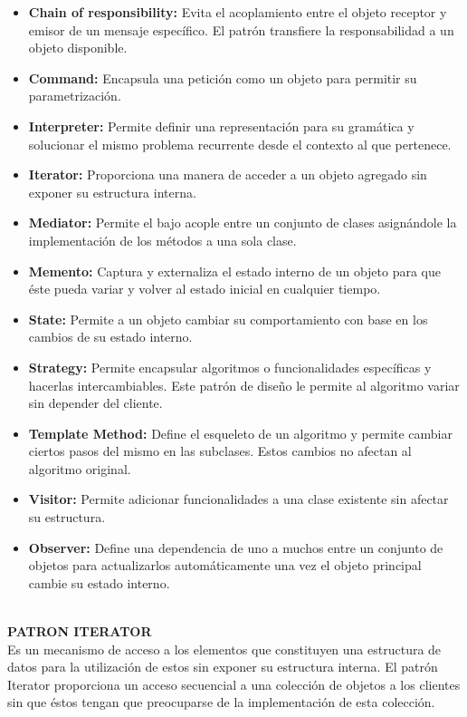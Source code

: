 \documentclass[twoside,twocolumn]{article}
\begin{document}
	\begin{itemize}
		\item \textbf{Chain of responsibility:}	Evita el acoplamiento entre el objeto receptor y emisor de un mensaje específico. El patrón transfiere la responsabilidad a un objeto disponible.  
		\item \textbf{Command:} Encapsula una petición como un objeto para permitir su parametrización.   
		\item \textbf{Interpreter:} Permite definir una representación para su gramática y solucionar el mismo problema recurrente desde el contexto al que pertenece.  
		\item \textbf{Iterator:}	Proporciona una manera de acceder a un objeto agregado sin exponer su estructura interna.  
		\item \textbf{Mediator:}  Permite el bajo acople entre un conjunto de clases asignándole la implementación de los métodos a una sola clase.   
		\item \textbf{Memento:} Captura y externaliza el estado interno de un objeto para que éste pueda variar y volver al estado inicial en cualquier tiempo.   
		\item \textbf{State:} Permite a un objeto cambiar su comportamiento con base en los cambios de su estado interno.  
        \item \textbf{Strategy:} Permite encapsular algoritmos o funcionalidades específicas y hacerlas intercambiables. Este patrón de diseño le permite al algoritmo variar sin depender del cliente.  
        \item \textbf{Template Method:} Define el esqueleto de un algoritmo y permite cambiar ciertos pasos del mismo en las subclases. Estos cambios no afectan al algoritmo original.  
        \item \textbf{Visitor:} Permite adicionar funcionalidades a una clase existente sin afectar su estructura. 
        \item \textbf{Observer:} Define una dependencia de uno a muchos entre un conjunto de objetos para actualizarlos automáticamente una vez el objeto principal cambie su estado interno. 
        \\
        \\
    \end{itemize}


    \item \textbf{PATRON ITERATOR} \\
    Es un mecanismo de acceso a los elementos que constituyen una estructura de datos para la utilización de estos sin exponer su estructura interna. 
    El patrón Iterator proporciona un acceso secuencial a una colección de objetos a los clientes sin que éstos tengan que preocuparse de la implementación de esta colección. 
    
\end{document}
